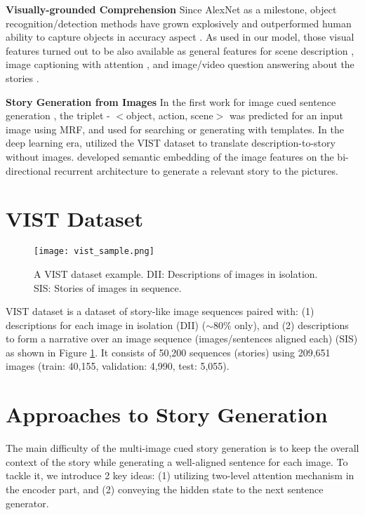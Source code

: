 \documentclass[11pt,a4paper]{article}
\begin{document}
\textbf{Visually-grounded Comprehension}  Since AlexNet \cite{kriz2012imgnet} as a milestone,  object recognition/detection methods have grown explosively and outperformed human ability to capture objects in accuracy aspect \cite{geirhos2017comphuman}. 
As used in our model, those visual features turned out to be also available as general features for scene description \cite{karpathy2016densecap,Karpathy2017dva}, image captioning with attention \cite{xu2015showattend}, and image/video question answering about the stories \cite{MovieQA,kim2017deepstory}.

\textbf{Story Generation from Images}
In the first work for image cued sentence generation \cite{farhadi2010every}, the triplet - $<$object, action, scene$>$ was predicted for an input image using MRF, and used for searching or generating with templates.
In the deep learning era, \citet{jain2017story} utilized the VIST dataset to translate description-to-story without images.
\citet{Liu2017let-photos-talk} developed semantic embedding of the image features on the bi-directional recurrent architecture to generate a relevant story to the pictures.




\section{VIST Dataset}
\begin{figure}[h!]
\texttt{[image: vist\_sample.png]}
\caption{A VIST dataset example. DII: Descriptions of images in isolation. SIS: Stories of images in sequence.}
\label{fig:vist}
\end{figure}
VIST dataset is a dataset of story-like image sequences paired with: (1) descriptions for each image in isolation (DII) ($\sim80\%$ only), and (2) descriptions to form a narrative over an image sequence (images/sentences aligned each) (SIS) as shown in Figure \ref{fig:vist}.
It consists of 50,200 sequences (stories) using 209,651 images (train: 40,155, validation: 4,990, test: 5,055).


\section{Approaches to Story Generation}

The main difficulty of the multi-image cued story generation is to keep the overall context of the story while generating a well-aligned sentence for each image. 
To tackle it, we introduce 2 key ideas: (1) utilizing two-level attention mechanism in the encoder part, and (2) conveying the hidden state to the next sentence generator.
\end{document}
